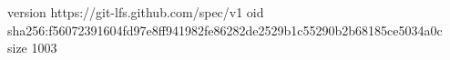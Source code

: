 version https://git-lfs.github.com/spec/v1
oid sha256:f56072391604fd97e8ff941982fe86282de2529b1c55290b2b68185ce5034a0c
size 1003
